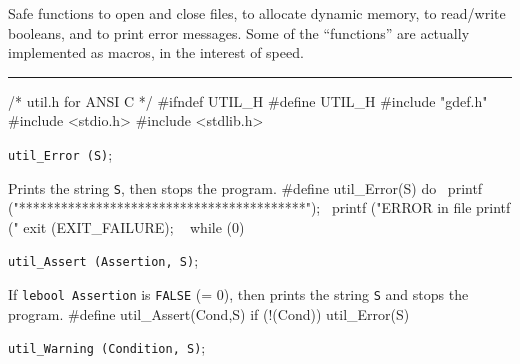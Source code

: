 
Safe functions to open and close files, to allocate dynamic memory,
to read/write booleans, and to print error messages. 
Some of the ``functions'' are actually implemented as macros, in the
interest of speed.

\bigskip\hrule
\code\hide
/* util.h  for ANSI C */
#ifndef UTIL_H
#define UTIL_H
\endhide
#include "gdef.h"
#include <stdio.h>
#include <stdlib.h>
\endcode





\noindent 
{\tt util\_Error (S)};

 \tab  Prints the string {\tt S}, then stops the program.
 \endtab
\code
\hide
#define util_Error(S) do { \
   printf ("\n\n******************************************\n"); \
   printf ("ERROR in file %
   printf ("%
   exit (EXIT_FAILURE); \
   } while (0)
\endhide
\endcode

\noindent 
{\tt util\_Assert (Assertion, S)};

 \tab  If {\tt lebool Assertion} is {\tt FALSE} (= 0), 
  then prints the string {\tt S} and stops the program.
 \endtab
\code
\hide
#define util_Assert(Cond,S) if (!(Cond)) util_Error(S)
\endhide
\endcode

\noindent 
{\tt util\_Warning (Condition, S)};

